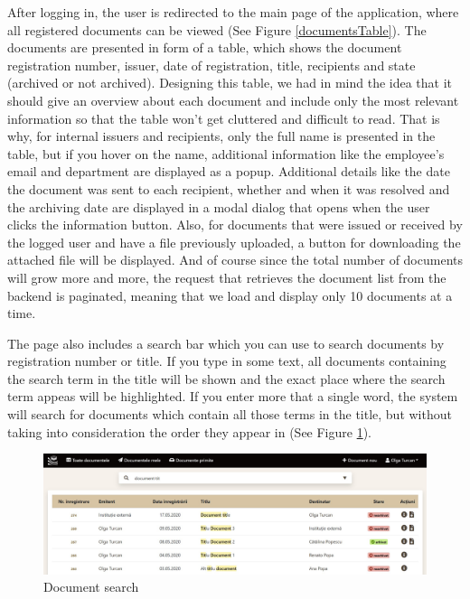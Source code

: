 After logging in, the user is redirected to the main page of the application, where all registered documents can be viewed (See Figure \ref{documentsTable}). The documents are presented in form of a table, which shows the document registration number, issuer, date of registration, title, recipients and state (archived or not archived). Designing this table, we had in mind the idea that it should give an overview about each document and include only the most relevant information so that the table won't get cluttered and difficult to read. That is why, for internal issuers and recipients, only the full name is presented in the table, but if you hover on the name, additional information like the employee's email and department are displayed as a popup. Additional details like the date the document was sent to each recipient, whether and when it was resolved and the archiving date are displayed in a modal dialog that opens when the user clicks the information button. Also, for documents that were issued or received by the logged user and have a file previously uploaded, a button for downloading the attached file will be displayed. And of course since the total number of documents will grow more and more, the request that retrieves the document list from the backend is paginated, meaning that we load and display only 10 documents at a time.

The page also includes a search bar which you can use to search documents by registration number or title. If you type in some text, all documents containing the search term in the title will be shown and the exact place where the search term appeas will be highlighted. If you enter more that a single word, the system will search for documents which contain all those terms in the title, but without taking into consideration the order they appear in (See Figure \ref{searchInline}).

\begin{figure}[H]
    \centering
    \includegraphics[width=5in]{images/app/search_inline_mix}
    \caption{Document search}
    \label{searchInline}
\end{figure}


